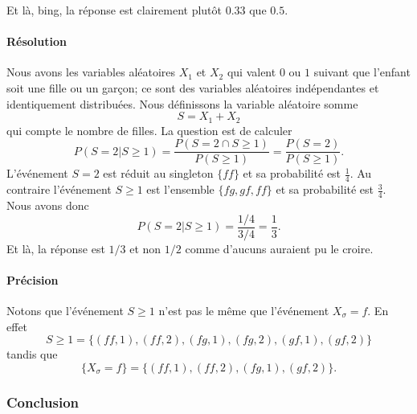 

Et là, bing, la réponse est clairement plutôt \( 0.33\) que \( 0.5\).

\paragraph{Résolution}

Nous avons les variables aléatoires \( X_1\) et \( X_2\) qui valent \( 0\) ou \( 1\) suivant que l'enfant soit une fille ou un garçon; ce sont des variables aléatoires indépendantes et identiquement distribuées. Nous définissons la variable aléatoire somme
\begin{equation}
	S=X_1+X_2
\end{equation}
qui compte le nombre de filles. La question est de calculer
\begin{equation}
	P( S=2|S\geq 1 )=\frac{ P(S=2\cap S\geq 1) }{ P(S\geq 1) }=\frac{ P(S=2) }{ P(S\geq 1) }.
\end{equation}
L'événement \( S=2\) est réduit au singleton \( \{ ff \}\) et sa probabilité est \( \frac{1}{ 4 }\). Au contraire l'événement \( S\geq 1\) est l'ensemble \( \{ fg,gf,ff \}\) et sa probabilité est \( \frac{ 3 }{ 4 }\). Nous avons donc
\begin{equation}
	P( S=2|S\geq 1 )=\frac{ 1/4 }{ 3/4 }=\frac{1}{ 3 }.
\end{equation}
Et là, la réponse est \( 1/3\) et non \( 1/2\) comme d'aucuns auraient pu le croire.

\paragraph{Précision}
Notons que l'événement \( S\geq 1\) n'est pas le même que l'événement \( X_{\sigma}=f\). En effet
\begin{equation}
	S\geq 1=\{ (ff,1),(ff,2),(fg,1),(fg,2),(gf,1),(gf,2) \}
\end{equation}
tandis que
\begin{equation}
	\{ X_{\sigma}=f \}=\{ (ff,1),(ff,2),(fg,1),(gf,2) \}.
\end{equation}

\subsubsection{Conclusion}

